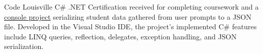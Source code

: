 {Code Louisville}
{C\# .NET}
{Certification received for completing coursework and a \href{https://github.com/jacobarchambault/jacobarchambault.codelou.exerciseproject}{console project} serializing student data gathered from user prompts to a JSON file. Developed in the Visual Studio IDE, the project's implemented C\# features include LINQ queries, reflection, delegates, exception handling, and JSON serialization.}
